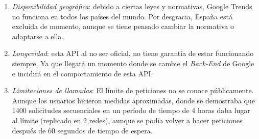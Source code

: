 \begin{itemize}
    \begin{enumerate}
    \item \textit{Disponibilidad geográfica}: debido a ciertas leyes y normativas, Google Trends no funciona en todos los países del mundo. Por desgracia, España está excluida de momento, aunque se tiene pensado cambiar la normativa o adaptarse a ella.
    \item \textit{Longevidad}: esta API al no ser oficial, no tiene garantía de estar funcionando siempre. Ya que llegará un momento donde se cambie el \textit{Back-End} de Google e incidirá en el comportamiento de esta API.
    \item \textit{Limitaciones de llamadas}: El límite de peticiones no se conoce públicamente. Aunque los usuarios hicieron medidas aproximadas, donde se demostraba que 1400 solicitudes secuenciales en un período de tiempo de 4 horas daba lugar al límite (replicado en 2 redes), aunque se podía volver a hacer peticiones después de 60 segundos de tiempo de espera.
    \end{enumerate}

\end{itemize}

